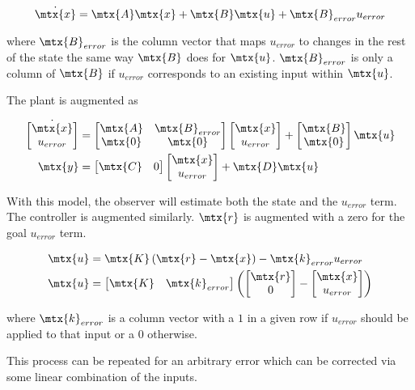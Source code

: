 \begin{equation*}
  \dot{\mtx{x}} = \mtx{A}\mtx{x} + \mtx{B}\mtx{u} + \mtx{B}_{error}u_{error}
\end{equation*}

where $\mtx{B}_{error}$ is the column vector that maps $u_{error}$ to changes in
the rest of the \gls{state} the same way $\mtx{B}$ does for $\mtx{u}$.
$\mtx{B}_{error}$ is only a column of $\mtx{B}$ if $u_{error}$ corresponds to an
existing \gls{input} within $\mtx{u}$.

The \gls{plant} is augmented as

\begin{align*}
  \dot{\begin{bmatrix}
    \mtx{x} \\
    u_{error}
  \end{bmatrix}} &=
  \begin{bmatrix}
    \mtx{A} & \mtx{B}_{error} \\
    \mtx{0} & \mtx{0}
  \end{bmatrix}
  \begin{bmatrix}
    \mtx{x} \\
    u_{error}
  \end{bmatrix} +
  \begin{bmatrix}
    \mtx{B} \\
    \mtx{0}
  \end{bmatrix}
  \mtx{u} \\
  \mtx{y} &= \begin{bmatrix}
    \mtx{C} & 0
  \end{bmatrix} \begin{bmatrix}
    \mtx{x} \\
    u_{error}
  \end{bmatrix} + \mtx{D}\mtx{u}
\end{align*}

With this \gls{model}, the \gls{observer} will estimate both the \gls{state} and
the $u_{error}$ term. The controller is augmented similarly. $\mtx{r}$ is
augmented with a zero for the goal $u_{error}$ term.

\begin{align*}
  \mtx{u} &= \mtx{K} \left(\mtx{r} - \mtx{x}\right) - \mtx{k}_{error}u_{error}
    \\
  \mtx{u} &=
  \begin{bmatrix}
    \mtx{K} & \mtx{k}_{error}
  \end{bmatrix}
  \left(\begin{bmatrix}
    \mtx{r} \\
    0
  \end{bmatrix} -
  \begin{bmatrix}
    \mtx{x} \\
    u_{error}
  \end{bmatrix}\right)
\end{align*}

where $\mtx{k}_{error}$ is a column vector with a $1$ in a given row if
$u_{error}$ should be applied to that \gls{input} or a $0$ otherwise.

This process can be repeated for an arbitrary \gls{error} which can be corrected
via some linear combination of the \glspl{input}.
